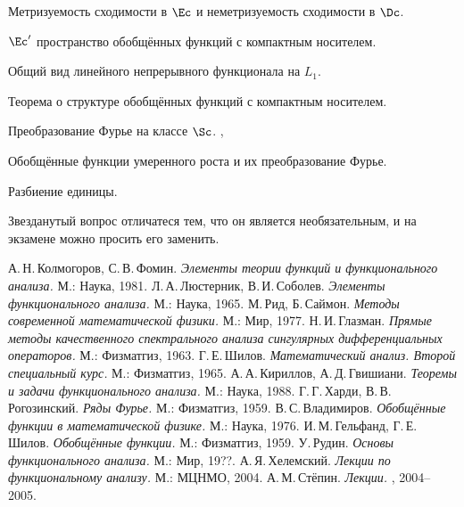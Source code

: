 \documentclass[a4paper]{article}
\begin{document}
\begin{nums}{-3}
\item Метризуемость сходимости в $\Ec$ и неметризуемость сходимости в $\Dc$. \cite{lec}
\item $\Ec'$ пространство обобщённых функций с компактным носителем. \cite{lec}
\item Общий вид линейного непрерывного функционала на $L_1$. \cite{lec}
\item Теорема о структуре обобщённых функций с компактным носителем. \cite[6]{ru}
\item Преобразование Фурье на классе $\Sc$. \cite[7.3]{h}, \cite[IV.2.3]{kg}
\item Обобщённые функции умеренного роста и их преобразование Фурье.
\item Разбиение единицы.
\end{nums}

\begin{note}
Звезданутый вопрос отличатеся тем, что он является необязательным, и на экзамене можно просить его заменить.
\end{note}

\begin{thebibliography}{ГШ}
\setlength\itemsep{-2pt}
    А.\,Н.\,Колмогоров, С.\,В.\,Фомин. \emph{Элементы теории функций и функционального анализа.} М.: Наука, 1981.
    Л.\,А.\,Люстерник, В.\,И.\,Соболев. \emph{Элементы функционального анализа.} М.: Наука, 1965.
    М.\,Рид, Б.\,Саймон. \emph{Методы современной математической физики.} М.: Мир, 1977.
    Н.\,И.\,Глазман. \emph{Прямые методы качественного спектрального анализа сингулярных
    дифференциальных операторов.} М.: Физматгиз, 1963.
    Г.\,Е.\,Шилов. \emph{Математический анализ. Второй специальный курс.} М.: Физматгиз, 1965.
    А.\,А.\,Кириллов, А.\,Д.\,Гвишиани. \emph{Теоремы и задачи функционального анализа.} М.: Наука, 1988.
    Г.\,Г.\,Харди, В.\,В.\,Рогозинский. \emph{Ряды Фурье.} М.: Физматгиз, 1959.
    В.\,С.\,Владимиров. \emph{Обобщённые функции в математической физике.} М.: Наука, 1976.
    И.\,М.\,Гельфанд, Г.\,Е.\,Шилов. \emph{Обобщённые функции.} М.: Физматгиз, 1959.
    У.\,Рудин. \emph{Основы функционального анализа.} М.: Мир, 19??.
    А.\,Я.\,Хелемский. \emph{Лекции по функциональному анализу.} М.: МЦНМО, 2004.
    А.\,М.\,Стёпин. \emph{Лекции.} \dmvnwebsite, 2004--2005.
\end{thebibliography}

\medskip\dmvntrail
\end{document}
